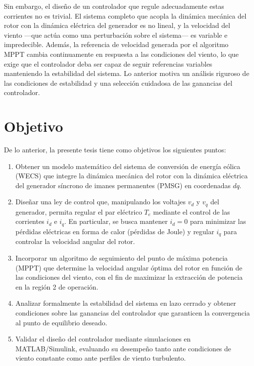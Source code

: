Sin embargo, el diseño de un controlador que regule adecuadamente estas 
corrientes no es trivial. El sistema completo que acopla la dinámica 
mecánica del rotor con la dinámica eléctrica del generador es no lineal, y 
la velocidad del viento ---que actúa como una perturbación sobre el 
sistema--- es variable e impredecible. Además, la referencia de velocidad 
generada por el algoritmo MPPT cambia continuamente en respuesta a las 
condiciones del viento, lo que exige que el controlador deba ser capaz de seguir 
referencias variables manteniendo la estabilidad del sistema. Lo anterior 
motiva un análisis riguroso de las condiciones de estabilidad y una 
selección cuidadosa de las ganancias del controlador.


\section{Objetivo}

De lo anterior, la presente tesis tiene como objetivos los siguientes puntos:

\begin{enumerate}
    \item Obtener un modelo matemático del sistema de conversión de energía 
    eólica (WECS) que integre la dinámica mecánica del rotor con la dinámica 
    eléctrica del generador síncrono de imanes permanentes (PMSG) en 
    coordenadas $dq$.

    \item Diseñar una ley de control que, manipulando los voltajes $v_d$ y 
    $v_q$ del generador, permita regular el par eléctrico $T_e$ mediante el 
    control de las corrientes $i_d$ e $i_q$. En particular, se busca mantener 
    $i_d = 0$ para minimizar las pérdidas eléctricas en forma de calor (pérdidas 
    de Joule) y regular $i_q$ para controlar la velocidad angular del rotor.

    \item Incorporar un algoritmo de seguimiento del punto de máxima potencia 
    (MPPT) que determine la velocidad angular óptima del rotor en función de 
    las condiciones del viento, con el fin de maximizar la extracción de 
    potencia en la región 2 de operación.

    \item Analizar formalmente la estabilidad del sistema en lazo cerrado y 
    obtener condiciones sobre las ganancias del controlador que garanticen la 
    convergencia al punto de equilibrio deseado.

    \item Validar el diseño del controlador mediante simulaciones en 
    MATLAB/Simulink, evaluando su desempeño tanto ante condiciones de viento 
    constante como ante perfiles de viento turbulento.
\end{enumerate}

